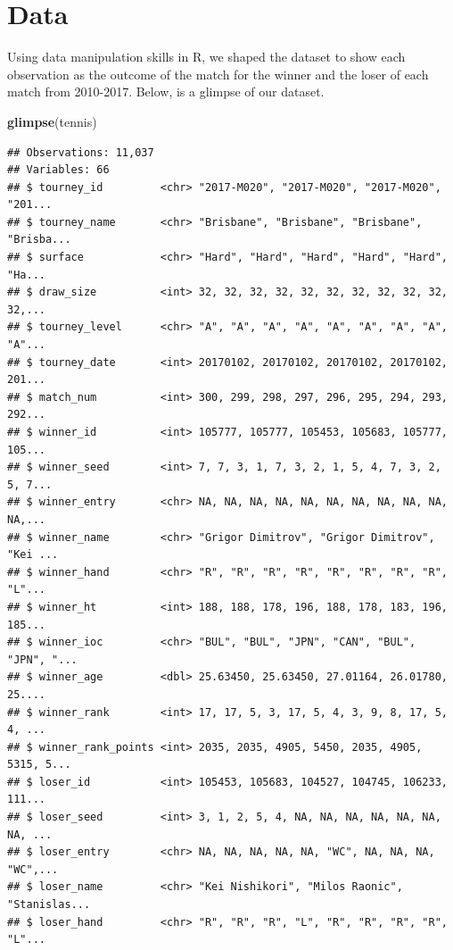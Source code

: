 \documentclass[]{article}
\newenvironment{Shaded}{\begin{snugshade}}{\end{snugshade}}
\newcommand{\KeywordTok}[1]{\textcolor[rgb]{0.13,0.29,0.53}{\textbf{#1}}}
\newcommand{\NormalTok}[1]{#1}
\begin{document}
\hypertarget{data}{%
\section{Data}\label{data}}

Using data manipulation skills in R, we shaped the dataset to show each
observation as the outcome of the match for the winner and the loser of
each match from 2010-2017. Below, is a glimpse of our dataset.

\begin{Shaded}
\begin{Highlighting}[]
\KeywordTok{glimpse}\NormalTok{(tennis)}
\end{Highlighting}
\end{Shaded}

\begin{verbatim}
## Observations: 11,037
## Variables: 66
## $ tourney_id         <chr> "2017-M020", "2017-M020", "2017-M020", "201...
## $ tourney_name       <chr> "Brisbane", "Brisbane", "Brisbane", "Brisba...
## $ surface            <chr> "Hard", "Hard", "Hard", "Hard", "Hard", "Ha...
## $ draw_size          <int> 32, 32, 32, 32, 32, 32, 32, 32, 32, 32, 32,...
## $ tourney_level      <chr> "A", "A", "A", "A", "A", "A", "A", "A", "A"...
## $ tourney_date       <int> 20170102, 20170102, 20170102, 20170102, 201...
## $ match_num          <int> 300, 299, 298, 297, 296, 295, 294, 293, 292...
## $ winner_id          <int> 105777, 105777, 105453, 105683, 105777, 105...
## $ winner_seed        <int> 7, 7, 3, 1, 7, 3, 2, 1, 5, 4, 7, 3, 2, 5, 7...
## $ winner_entry       <chr> NA, NA, NA, NA, NA, NA, NA, NA, NA, NA, NA,...
## $ winner_name        <chr> "Grigor Dimitrov", "Grigor Dimitrov", "Kei ...
## $ winner_hand        <chr> "R", "R", "R", "R", "R", "R", "R", "R", "L"...
## $ winner_ht          <int> 188, 188, 178, 196, 188, 178, 183, 196, 185...
## $ winner_ioc         <chr> "BUL", "BUL", "JPN", "CAN", "BUL", "JPN", "...
## $ winner_age         <dbl> 25.63450, 25.63450, 27.01164, 26.01780, 25....
## $ winner_rank        <int> 17, 17, 5, 3, 17, 5, 4, 3, 9, 8, 17, 5, 4, ...
## $ winner_rank_points <int> 2035, 2035, 4905, 5450, 2035, 4905, 5315, 5...
## $ loser_id           <int> 105453, 105683, 104527, 104745, 106233, 111...
## $ loser_seed         <int> 3, 1, 2, 5, 4, NA, NA, NA, NA, NA, NA, NA, ...
## $ loser_entry        <chr> NA, NA, NA, NA, NA, "WC", NA, NA, NA, "WC",...
## $ loser_name         <chr> "Kei Nishikori", "Milos Raonic", "Stanislas...
## $ loser_hand         <chr> "R", "R", "R", "L", "R", "R", "R", "R", "L"...

\end{verbatim}
\end{document}
